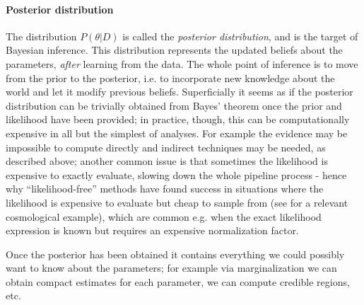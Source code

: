 \paragraph{Posterior distribution}
The distribution $P(\theta|D)$ is called the \emph{posterior distribution}, and is the target of Bayesian inference. This distribution represents the updated beliefs about the parameters, \emph{after} learning from the data. The whole point of inference is to move from the prior to the posterior, i.e. to incorporate new knowledge about the world and let it modify previous beliefs. Superficially it seems as if the posterior distribution can be trivially obtained from Bayes' theorem once the prior and likelihood have been provided; in practice, though, this can be computationally expensive in all but the simplest of analyses. For example the evidence may be impossible to compute directly and indirect techniques may be needed, as described above; another common issue is that sometimes the likelihood is expensive to exactly evaluate, slowing down the whole pipeline process - hence why ``likelihood-free'' methods have found success in situations where the likelihood is expensive to evaluate but cheap to sample from (see \cite{astroabc} for a relevant cosmological example), which are common e.g. when the exact likelihood expression is known but requires an expensive normalization factor.

Once the posterior has been obtained it contains everything we could possibly want to know about the parameters; for example via marginalization we can obtain compact estimates for each parameter, we can compute credible regions, etc.

